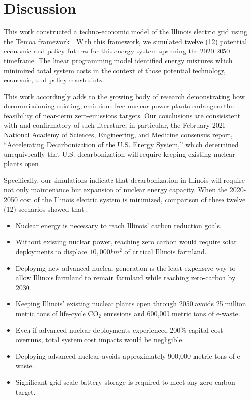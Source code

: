 \section{Discussion}\label{sec:discussion}
This work constructed a techno-economic model of the Illinois electric grid 
using the Temoa framework \cite{decarolis_modelling_2016}. With this framework, 
we simulated twelve (12) potential economic and policy futures for this energy 
system spanning the 2020-2050 timeframe. The linear programming model 
identified energy mixtures which minimized total system costs 
in the context of those potential technology, economic, and policy constraints.

This work accordingly adds to the growing body of research demonstrating how 
decommissioning existing, emissions-free nuclear power plants endangers the 
feasibility of near-term zero-emissions targets.  Our conclusions are 
consisistent with and confirmatory of such literature, in particular, the 
February 2021 National Academy of Sciences, Engineering, and Medicine consensus 
report, ``Accelerating Decarbonization of the U.S. Energy System,'' which determined unequivocally that U.S. decarbonization will require keeping existing nuclear plants open
\cite{national_academies_of_sciences_engineering_and_medicine_2021_accelerating_2021}.

Specifically, our simulations indicate that decarbonization
in Illinois will require not only maintenance but expansion of nuclear energy capacity.
When the 2020-2050 cost of the Illinois electric system is minimized, 
comparison of these twelve (12) scenarios showed that :

\begin{itemize}
        \item Nuclear energy is necessary to reach Illinois' carbon reduction
                goals.
        \item Without existing nuclear power, reaching zero carbon would
                require solar deployments to displace $10,000km^2$ of critical
                Illinois
                farmland.
        \item Deploying new advanced nuclear generation is the least expensive way to
                allow Illinois farmland to remain farmland while reaching
                zero-carbon by 2030.
        \item Keeping Illinois' existing nuclear plants open through
                2050 avoids 25 million metric tons of life-cycle CO$_2$
                emissions and 600,000 metric tons of e-waste.
        \item Even if advanced nuclear deployments experienced 200\% capital
                cost overruns, total system cost impacts would be negligible.
        \item Deploying advanced nuclear avoids approximately 900,000 metric
                tons of e-waste.
        \item Significant grid-scale battery storage is required to meet any zero-carbon
                target.
\end{itemize}

